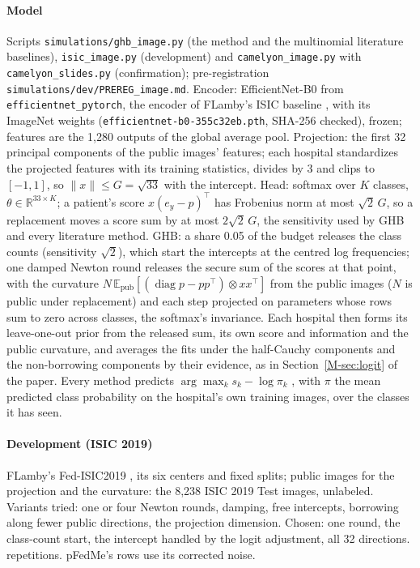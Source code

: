 \documentclass[acmsmall,screen,nonacm]{acmart}
\theoremstyle{acmdefinition}
\begin{document}
\paragraph{Model} Scripts \texttt{simulations/ghb\_image.py} (the method and the multinomial literature baselines), \texttt{isic\_image.py} (development) and \texttt{camelyon\_image.py} with \texttt{camelyon\_slides.py} (confirmation); pre-registration \texttt{simulations/dev/PREREG\_image.md}. Encoder: EfficientNet-B0 \cite{tan2019efficientnet} from \texttt{efficientnet\_pytorch}, the encoder of FLamby's ISIC baseline \cite{ogierduterrail2022flamby}, with its ImageNet weights (\texttt{efficientnet-b0-355c32eb.pth}, SHA-256 checked), frozen; features are the 1,280 outputs of the global average pool. Projection: the first 32 principal components of the public images' features; each hospital standardizes the projected features with its training statistics, divides by 3 and clips to $[-1,1]$, so $\|x\|\le G=\sqrt{33}$ with the intercept. Head: softmax over $K$ classes, $\theta\in\mathbb{R}^{33\times K}$; a patient's score $x(e_y-p)^\top$ has Frobenius norm at most $\sqrt2\,G$, so a replacement moves a score sum by at most $2\sqrt2\,G$, the sensitivity used by GHB and every literature method. GHB: a share 0.05 of the budget releases the class counts (sensitivity $\sqrt2$), which start the intercepts at the centred log frequencies; one damped Newton round releases the secure sum of the scores at that point, with the curvature $N\,\mathbb{E}_{\text{pub}}[(\operatorname{diag}p-pp^\top)\otimes xx^\top]$ from the public images ($N$ is public under replacement) and each step projected on parameters whose rows sum to zero across classes, the softmax's invariance. Each hospital then forms its leave-one-out prior from the released sum, its own score and information and the public curvature, and averages the fits under the half-Cauchy components and the non-borrowing components by their evidence, as in Section~\ref{M-sec:logit} of the paper. Every method predicts $\arg\max_k s_k-\log\pi_k$ \cite{menon2021longtail}, with $\pi$ the mean predicted class probability on the hospital's own training images, over the classes it has seen.

\paragraph{Development (ISIC 2019)} FLamby's Fed-ISIC2019 \cite{combalia2019bcn20000}, its six centers and fixed splits; public images for the projection and the curvature: the 8,238 ISIC 2019 Test images, unlabeled. Variants tried: one or four Newton rounds, damping, free intercepts, borrowing along fewer public directions, the projection dimension. Chosen: one round, the class-count start, the intercept handled by the logit adjustment, all 32 directions. \SimIsicImgReps{} repetitions. pFedMe's rows use its corrected noise.
\end{document}
